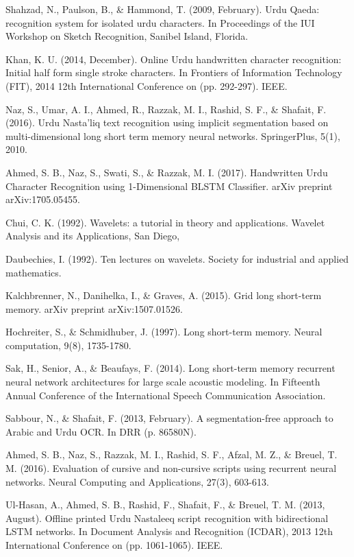 \begin{thebibliography}{130}
Shahzad, N., Paulson, B., \& Hammond, T. (2009, February). Urdu Qaeda: recognition system for isolated urdu characters. In Proceedings of the IUI Workshop on Sketch Recognition, Sanibel Island, Florida.

Khan, K. U. (2014, December). Online Urdu handwritten character recognition: Initial half form single stroke characters. In Frontiers of Information Technology (FIT), 2014 12th International Conference on (pp. 292-297). IEEE.

Naz, S., Umar, A. I., Ahmed, R., Razzak, M. I., Rashid, S. F., \& Shafait, F. (2016). Urdu Nasta’liq text recognition using implicit segmentation based on multi-dimensional long short term memory neural networks. SpringerPlus, 5(1), 2010.

Ahmed, S. B., Naz, S., Swati, S., \& Razzak, M. I. (2017). Handwritten Urdu Character Recognition using 1-Dimensional BLSTM Classifier. arXiv preprint arXiv:1705.05455.

Chui, C. K. (1992). Wavelets: a tutorial in theory and applications. Wavelet Analysis and its Applications, San Diego,

Daubechies, I. (1992). Ten lectures on wavelets. Society for industrial and applied mathematics.

Kalchbrenner, N., Danihelka, I., \& Graves, A. (2015). Grid long short-term memory.  arXiv preprint arXiv:1507.01526.

Hochreiter, S., \& Schmidhuber, J. (1997). Long short-term memory.  Neural computation, 9(8), 1735-1780.

Sak, H., Senior, A., \& Beaufays, F. (2014). Long short-term memory recurrent neural network architectures for large scale acoustic modeling. In Fifteenth Annual Conference of the International Speech Communication Association.

Sabbour, N., \& Shafait, F. (2013, February). A segmentation-free approach to Arabic and Urdu OCR. In DRR (p. 86580N).

Ahmed, S. B., Naz, S., Razzak, M. I., Rashid, S. F., Afzal, M. Z., \& Breuel, T. M. (2016). Evaluation of cursive and non-cursive scripts using recurrent neural networks. Neural Computing and Applications, 27(3), 603-613.

Ul-Hasan, A., Ahmed, S. B., Rashid, F., Shafait, F., \& Breuel, T. M. (2013, August). Offline printed Urdu Nastaleeq script recognition with bidirectional LSTM networks. In Document Analysis and Recognition (ICDAR), 2013 12th International Conference on (pp. 1061-1065). IEEE.


\end{thebibliography}
